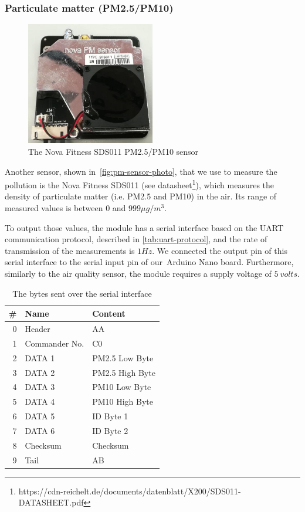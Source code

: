 \documentclass[12pt]{article}
\begin{document}
  \subsubsection{Particulate matter (PM2.5/PM10)}
  \begin{figure}[H]
    \centering
    \includegraphics[width=0.5\textwidth]{images/pm-sensor.jpg}
    \caption{The Nova Fitness SDS011 PM2.5/PM10 sensor}
    \label{fig:pm-sensor-photo}
  \end{figure}
  Another sensor, shown in~\autoref{fig:pm-sensor-photo}, that we use to measure the pollution is the Nova Fitness SDS011 (see datasheet\footnote{https://cdn-reichelt.de/documents/datenblatt/X200/SDS011-DATASHEET.pdf}), which measures the density of particulate matter (i.e. PM2.5 and PM10) in the air. Its range of measured values is between $0$ and $999\mu g/m^3$.

  To output those values, the module has a serial interface based on the UART communication protocol, described in \autoref{tab:uart-protocol}, and the rate of transmission of the measurements is $1Hz$. We connected the output pin of this serial interface to the serial input pin of our Arduino Nano board. Furthermore, similarly to the air quality sensor, the module requires a supply voltage of $5\ volts$.

  \begin{table}[H]
    \centering
    \begin{tabular}{r | l | l}
      \# & Name & Content\\\toprule
      0 & Header & AA\\
      1 & Commander No. & C0\\
      2 & DATA 1 & PM2.5 Low Byte\\
      3 & DATA 2 & PM2.5 High Byte\\
      4 & DATA 3 & PM10 Low Byte\\
      5 & DATA 4 & PM10 High Byte\\
      6 & DATA 5 & ID Byte 1\\
      7 & DATA 6 & ID Byte 2\\
      8 & Checksum & Checksum\\
      9 & Tail & AB\\
    \end{tabular}
    \caption{The bytes sent over the serial interface}
    \label{tab:uart-protocol}
  \end{table}
\end{document}
